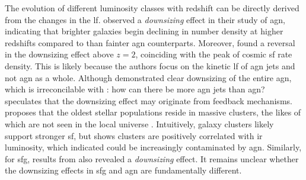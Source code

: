 The evolution of different luminosity classes with redshift can be directly derived from the changes in the \gls{lf}. \cite{han_evolution_2012} observed a \textit{downsizing} effect in their study of \gls{agn}, indicating that brighter galaxies begin declining in number density at higher redshifts compared to than fainter \gls{agn} counterparts. Moreover, \cite{merloni_synthesis_2008} found a reversal in the downsizing effect above $z=2$, coinciding with the peak of cosmic \gls{sf} rate density. This is likely because the authors focus on the kinetic \gls{lf} of \gls{agn} jets and not \gls{agn} as a whole. Although \cite{fanidakis_evolution_2012} demonstrated clear downsizing of the entire \gls{agn}, which is irreconcilable with \cite{merloni_synthesis_2008}: how can there be more \gls{agn} jets than \gls{agn}? \cite{fiore_agn_2017} speculates that the downsizing effect may originate from feedback mechanisms. \cite{wylezalek_galaxy_2014} proposes that the oldest stellar populations reside in massive clusters, the likes of which are not seen in the local universe \citep{croton_many_2006}. Intuitively, galaxy clusters likely support stronger \gls{sf}, but \cite{wang_imperial_2010} shows clusters are positively correlated with \gls{ir} luminosity, which \cite{symeonidis_agn_2021} indicated could be increasingly contaminated by \gls{agn}. Similarly, for \gls{sfg}, results from \cite{gruppioni_herschel_2013} also revealed a \textit{downsizing} effect. It remains unclear whether the downsizing effects in \gls{sfg} and \gls{agn} are fundamentally different.

